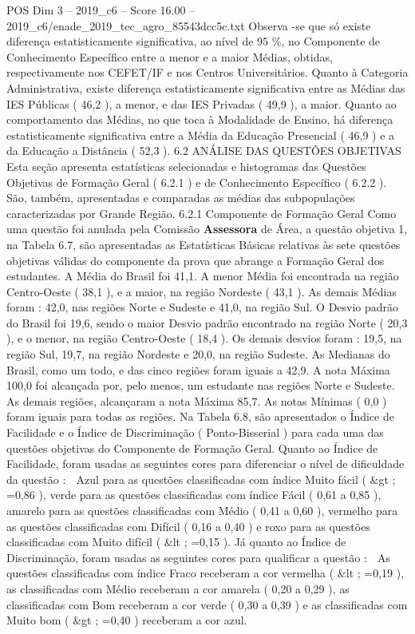 \begin{textsample}{POS Dim 3 – 2019\_c6 – Score 16.00 – 2019\_c6/enade\_2019\_tec\_agro\_85543dcc5c.txt}
Observa -se que só existe diferença estatisticamente significativa, ao nível de 95 \%, no Componente de Conhecimento Específico entre a menor e a maior Médias, obtidas, respectivamente nos CEFET/IF e nos Centros Universitários.
Quanto à Categoria Administrativa, existe diferença estatisticamente significativa entre as Médias das IES Públicas ( 46,2 ), a menor, e das IES Privadas ( 49,9 ), a maior.
Quanto ao comportamento das Médias, no que toca à Modalidade de Ensino, há diferença estatisticamente significativa entre a Média da Educação Presencial ( 46,9 ) e a da Educação a Distância ( 52,3 ). 6.2 ANÁLISE DAS QUESTÕES OBJETIVAS Esta seção apresenta estatísticas selecionadas e histogramas das Questões Objetivas de Formação Geral ( 6.2.1 ) e de Conhecimento Específico ( 6.2.2 ).
São, também, apresentadas e comparadas as médias das subpopulações caracterizadas por Grande Região. 6.2.1 Componente de Formação Geral Como uma questão foi anulada pela Comissão \textbf{Assessora} de Área, a questão objetiva 1, na Tabela 6.7, são apresentadas as Estatísticas Básicas relativas às sete questões objetivas válidas do componente da prova que abrange a Formação Geral dos estudantes.
A Média do Brasil foi 41,1.
A menor Média foi encontrada na região Centro-Oeste ( 38,1 ), e a maior, na região Nordeste ( 43,1 ).
As demais Médias foram : 42,0, nas regiões Norte e Sudeste e 41,0, na região Sul.
O Desvio padrão do Brasil foi 19,6, sendo o maior Desvio padrão encontrado na região Norte ( 20,3 ), e o menor, na região Centro-Oeste ( 18,4 ).
Os demais desvios foram : 19,5, na região Sul, 19,7, na região Nordeste e 20,0, na região Sudeste.
As Medianas do Brasil, como um todo, e das cinco regiões foram iguais a 42,9.
A nota Máxima 100,0 foi alcançada por, pelo menos, um estudante nas regiões Norte e Sudeste.
As demais regiões, alcançaram a nota Máxima 85,7.
As notas Mínimas ( 0,0 ) foram iguais para todas as regiões.
Na Tabela 6.8, são apresentados o Índice de Facilidade e o Índice de Discriminação ( Ponto-Bisserial ) para cada uma das questões objetivas do Componente de Formação Geral.
Quanto ao Índice de Facilidade, foram usadas as seguintes cores para diferenciar o nível de dificuldade da questão :  Azul para as questões classificadas com índice Muito fácil ( \&gt ; =0,86 ), verde para as questões classificadas com índice Fácil ( 0,61 a 0,85 ), amarelo para as questões classificadas com Médio ( 0,41 a 0,60 ), vermelho para as questões classificadas com Difícil ( 0,16 a 0,40 ) e roxo para as questões classificadas com Muito difícil ( \&lt ; =0,15 ).
Já quanto ao Índice de Discriminação, foram usadas as seguintes cores para qualificar a questão :  As questões classificadas com índice Fraco receberam a cor vermelha ( \&lt ; =0,19 ), as classificadas com Médio receberam a cor amarela ( 0,20 a 0,29 ), as classificadas com Bom receberam a cor verde ( 0,30 a 0,39 ) e as classificadas com Muito bom ( \&gt ; =0,40 ) receberam a cor azul.

\end{textsample}

